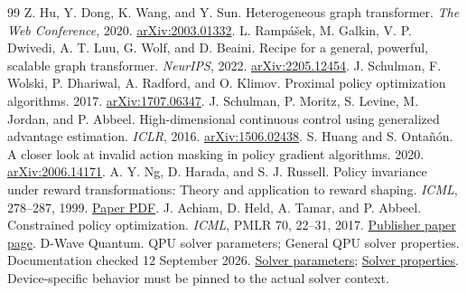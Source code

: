 \documentclass[11pt,a4paper]{article}
\theoremstyle{definition}\newtheorem{definition}[proposition]{Definition}
\begin{document}
\begin{thebibliography}{99}
 Z. Hu, Y. Dong, K. Wang, and Y. Sun. Heterogeneous graph transformer. \emph{The Web Conference}, 2020. \href{https://arxiv.org/abs/2003.01332}{arXiv:2003.01332}.
 L. Ramp\'a\v{s}ek, M. Galkin, V. P. Dwivedi, A. T. Luu, G. Wolf, and D. Beaini. Recipe for a general, powerful, scalable graph transformer. \emph{NeurIPS}, 2022. \href{https://arxiv.org/abs/2205.12454}{arXiv:2205.12454}.
 J. Schulman, F. Wolski, P. Dhariwal, A. Radford, and O. Klimov. Proximal policy optimization algorithms. 2017. \href{https://arxiv.org/abs/1707.06347}{arXiv:1707.06347}.
 J. Schulman, P. Moritz, S. Levine, M. Jordan, and P. Abbeel. High-dimensional continuous control using generalized advantage estimation. \emph{ICLR}, 2016. \href{https://arxiv.org/abs/1506.02438}{arXiv:1506.02438}.
 S. Huang and S. Onta\~n\'on. A closer look at invalid action masking in policy gradient algorithms. 2020. \href{https://arxiv.org/abs/2006.14171}{arXiv:2006.14171}.
 A. Y. Ng, D. Harada, and S. J. Russell. Policy invariance under reward transformations: Theory and application to reward shaping. \emph{ICML}, 278--287, 1999. \href{https://luthuli.cs.uiuc.edu/~daf/courses/Games/AIpapers/ml99-shaping.pdf}{Paper PDF}.
 J. Achiam, D. Held, A. Tamar, and P. Abbeel. Constrained policy optimization. \emph{ICML}, PMLR 70, 22--31, 2017. \href{https://proceedings.mlr.press/v70/achiam17a.html}{Publisher paper page}.
 D-Wave Quantum. QPU solver parameters; General QPU solver properties. Documentation checked 12 September 2026. \href{https://docs.dwavequantum.com/en/latest/quantum_research/solver_parameters.html}{Solver parameters}; \href{https://docs.dwavequantum.com/en/latest/quantum_research/solver_properties_all.html}{Solver properties}. Device-specific behavior must be pinned to the actual solver context.
\end{thebibliography}
 
\end{document}
